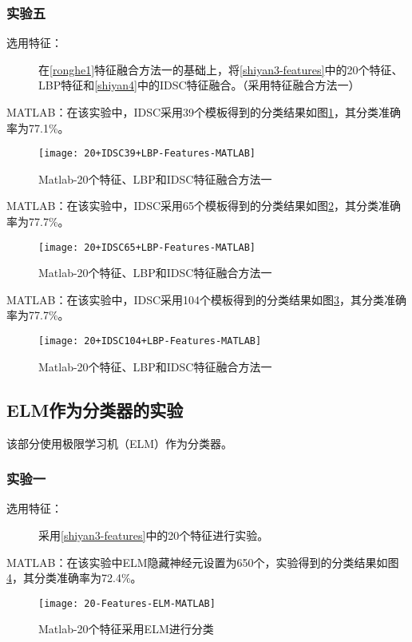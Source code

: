 \subsubsection{实验五}
\begin{description}
\item[选用特征：] 在\ref{ronghe1}特征融合方法一的基础上，将\ref{shiyan3-features}中的20个特征、LBP特征和\ref{shiyan4}中的IDSC特征融合。（采用特征融合方法一）
\end{description}

MATLAB：在该实验中，IDSC采用39个模板得到的分类结果如图\ref{fig:20+IDSC39+LBP-Features-MATLAB}，其分类准确率为77.1\%。
\begin{figure}[!ht]
\centering
\texttt{[image: 20+IDSC39+LBP-Features-MATLAB]}
\caption{Matlab-20个特征、LBP和IDSC特征融合方法一}
\label{fig:20+IDSC39+LBP-Features-MATLAB}
\end{figure}

MATLAB：在该实验中，IDSC采用65个模板得到的分类结果如图\ref{fig:20+IDSC65+LBP-Features-MATLAB}，其分类准确率为77.7\%。
\begin{figure}[!ht]
\centering
\texttt{[image: 20+IDSC65+LBP-Features-MATLAB]}
\caption{Matlab-20个特征、LBP和IDSC特征融合方法一}
\label{fig:20+IDSC65+LBP-Features-MATLAB}
\end{figure}

MATLAB：在该实验中，IDSC采用104个模板得到的分类结果如图\ref{fig:20+IDSC104+LBP-Features-MATLAB}，其分类准确率为77.7\%。
\begin{figure}[!ht]
\centering
\texttt{[image: 20+IDSC104+LBP-Features-MATLAB]}
\caption{Matlab-20个特征、LBP和IDSC特征融合方法一}
\label{fig:20+IDSC104+LBP-Features-MATLAB}
\end{figure}

\subsection{ELM作为分类器的实验}
该部分使用极限学习机（ELM）作为分类器。

\subsubsection{实验一}
\begin{description}
\item[选用特征：] 采用\ref{shiyan3-features}中的20个特征进行实验。
\end{description}
MATLAB：在该实验中ELM隐藏神经元设置为650个，实验得到的分类结果如图\ref{fig:20-Features-ELM-MATLAB}，其分类准确率为72.4\%。
\begin{figure}[!ht]
\centering
\texttt{[image: 20-Features-ELM-MATLAB]}
\caption{Matlab-20个特征采用ELM进行分类}
\label{fig:20-Features-ELM-MATLAB}
\end{figure}


